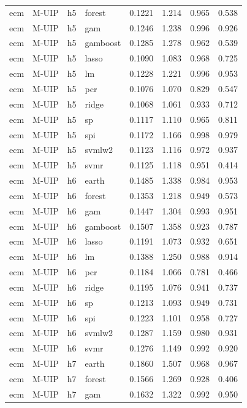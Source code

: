 \begin{ThreePartTable}
\begin{longtable}[t]{llclcccc}
ecm & M-UIP & h5 & forest & 0.1221 & 1.214 & 0.965 & 0.538\\
ecm & M-UIP & h5 & gam & 0.1246 & 1.238 & 0.996 & 0.926\\
ecm & M-UIP & h5 & gamboost & 0.1285 & 1.278 & 0.962 & 0.539\\
ecm & M-UIP & h5 & lasso & 0.1090 & 1.083 & 0.968 & 0.725\\
ecm & M-UIP & h5 & lm & 0.1228 & 1.221 & 0.996 & 0.953\\
ecm & M-UIP & h5 & pcr & 0.1076 & 1.070 & 0.829 & 0.547\\
ecm & M-UIP & h5 & ridge & 0.1068 & 1.061 & 0.933 & 0.712\\
ecm & M-UIP & h5 & sp & 0.1117 & 1.110 & 0.965 & 0.811\\
ecm & M-UIP & h5 & spi & 0.1172 & 1.166 & 0.998 & 0.979\\
ecm & M-UIP & h5 & svmlw2 & 0.1123 & 1.116 & 0.972 & 0.937\\
ecm & M-UIP & h5 & svmr & 0.1125 & 1.118 & 0.951 & 0.414\\
\addlinespace
ecm & M-UIP & h6 & earth & 0.1485 & 1.338 & 0.984 & 0.953\\
ecm & M-UIP & h6 & forest & 0.1353 & 1.218 & 0.949 & 0.573\\
ecm & M-UIP & h6 & gam & 0.1447 & 1.304 & 0.993 & 0.951\\
ecm & M-UIP & h6 & gamboost & 0.1507 & 1.358 & 0.923 & 0.787\\
ecm & M-UIP & h6 & lasso & 0.1191 & 1.073 & 0.932 & 0.651\\
ecm & M-UIP & h6 & lm & 0.1388 & 1.250 & 0.988 & 0.914\\
ecm & M-UIP & h6 & pcr & 0.1184 & 1.066 & 0.781 & 0.466\\
ecm & M-UIP & h6 & ridge & 0.1195 & 1.076 & 0.941 & 0.737\\
ecm & M-UIP & h6 & sp & 0.1213 & 1.093 & 0.949 & 0.731\\
ecm & M-UIP & h6 & spi & 0.1223 & 1.101 & 0.958 & 0.727\\
ecm & M-UIP & h6 & svmlw2 & 0.1287 & 1.159 & 0.980 & 0.931\\
ecm & M-UIP & h6 & svmr & 0.1276 & 1.149 & 0.992 & 0.920\\
\addlinespace
ecm & M-UIP & h7 & earth & 0.1860 & 1.507 & 0.968 & 0.967\\
ecm & M-UIP & h7 & forest & 0.1566 & 1.269 & 0.928 & 0.406\\
ecm & M-UIP & h7 & gam & 0.1632 & 1.322 & 0.992 & 0.950\\

\end{longtable}
\end{ThreePartTable}

